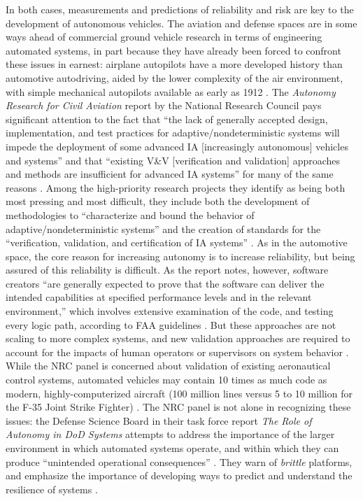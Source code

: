 
In both cases, measurements and predictions of reliability and risk
are key to the development of autonomous vehicles. The aviation and
defense spaces are in some ways ahead of commercial ground vehicle
research in terms of engineering automated systems, in part because
they have already been forced to confront these issues in earnest:
airplane autopilots have a more developed history than automotive
autodriving, aided by the lower complexity of the air environment,
with simple mechanical autopilots available as early as
1912 \cite[p. 16]{NRCAutonomy}. The \emph{Autonomy Research for
  Civil Aviation} report by the National Research Council pays
significant attention to the fact that ``the lack of generally
accepted design, implementation, and test practices for
adaptive/nondeterministic systems will impede the deployment of some
advanced IA [increasingly autonomous] vehicles and systems'' and that
``existing V\&V [verification and
  validation] approaches and methods are insufficient for advanced IA
systems'' for many of the same reasons \cite[p. 2]{NRCAutonomy}.
Among the high-priority research projects they identify as being both
most pressing and most difficult, they include both the development of
methodologies to ``characterize and bound the behavior of
adaptive/nondeterministic systems'' and the creation of standards for
the ``verification, validation, and certification of IA
systems'' \cite[p. 4]{NRCAutonomy}. As in the automotive space, the
core reason for increasing autonomy is to increase reliability, but
being assured of this reliability is difficult. As the report notes,
however, software creators ``are generally expected to prove that the
software can deliver the intended capabilities at specified
performance levels and in the relevant environment,'' which involves
extensive examination of the code, and testing every logic path,
according to FAA guidelines \cite[p. 39--40]{NRCAutonomy}. But
these approaches are not scaling to more complex systems, and new
validation approaches are required to account for the impacts of human
operators or supervisors on system behavior \cite[p.
  40]{NRCAutonomy}. While
the NRC panel is concerned about validation of existing aeronautical
control systems, automated vehicles may contain 10 times as much code
as modern, highly-computerized aircraft (100 million lines versus 5 to
10 million for the F-35 Joint Strike Fighter)
\cite{http://mobile.reuters.com/article/idUSKBN0MN1E820150327?irpc=932}.
The NRC panel is not alone in recognizing these 
issues: the Defense Science Board in their task force report \emph{The
  Role of Autonomy in DoD Systems} attempts to address the importance
of the larger environment in which automated systems operate, and
within which they can produce ``unintended operational
consequences'' \cite[p. 2]{DSB}. They warn of \emph{brittle}
platforms, and emphasize the importance of developing ways to predict
and understand the resilience of systems \cite[p. 7, 11]{DSB}.

